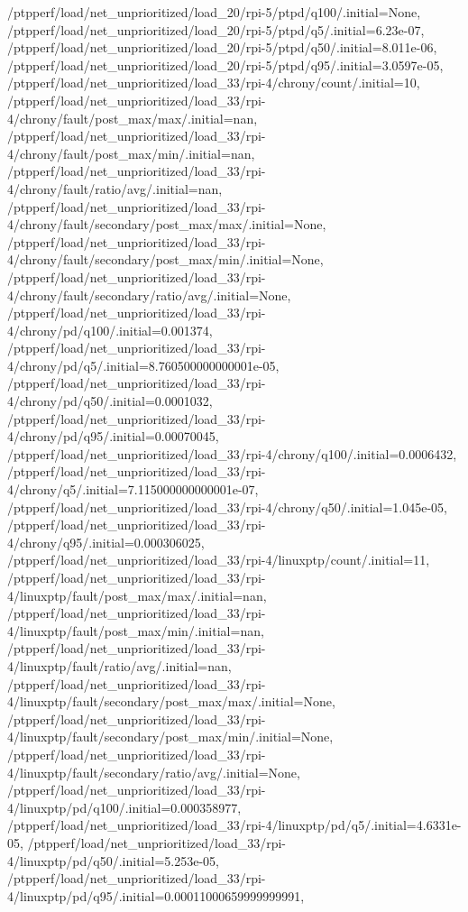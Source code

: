 {    /ptpperf/load/net_unprioritized/load_20/rpi-5/ptpd/q100/.initial=None,
    /ptpperf/load/net_unprioritized/load_20/rpi-5/ptpd/q5/.initial=6.23e-07,
    /ptpperf/load/net_unprioritized/load_20/rpi-5/ptpd/q50/.initial=8.011e-06,
    /ptpperf/load/net_unprioritized/load_20/rpi-5/ptpd/q95/.initial=3.0597e-05,
    /ptpperf/load/net_unprioritized/load_33/rpi-4/chrony/count/.initial=10,
    /ptpperf/load/net_unprioritized/load_33/rpi-4/chrony/fault/post_max/max/.initial=nan,
    /ptpperf/load/net_unprioritized/load_33/rpi-4/chrony/fault/post_max/min/.initial=nan,
    /ptpperf/load/net_unprioritized/load_33/rpi-4/chrony/fault/ratio/avg/.initial=nan,
    /ptpperf/load/net_unprioritized/load_33/rpi-4/chrony/fault/secondary/post_max/max/.initial=None,
    /ptpperf/load/net_unprioritized/load_33/rpi-4/chrony/fault/secondary/post_max/min/.initial=None,
    /ptpperf/load/net_unprioritized/load_33/rpi-4/chrony/fault/secondary/ratio/avg/.initial=None,
    /ptpperf/load/net_unprioritized/load_33/rpi-4/chrony/pd/q100/.initial=0.001374,
    /ptpperf/load/net_unprioritized/load_33/rpi-4/chrony/pd/q5/.initial=8.760500000000001e-05,
    /ptpperf/load/net_unprioritized/load_33/rpi-4/chrony/pd/q50/.initial=0.0001032,
    /ptpperf/load/net_unprioritized/load_33/rpi-4/chrony/pd/q95/.initial=0.00070045,
    /ptpperf/load/net_unprioritized/load_33/rpi-4/chrony/q100/.initial=0.0006432,
    /ptpperf/load/net_unprioritized/load_33/rpi-4/chrony/q5/.initial=7.115000000000001e-07,
    /ptpperf/load/net_unprioritized/load_33/rpi-4/chrony/q50/.initial=1.045e-05,
    /ptpperf/load/net_unprioritized/load_33/rpi-4/chrony/q95/.initial=0.000306025,
    /ptpperf/load/net_unprioritized/load_33/rpi-4/linuxptp/count/.initial=11,
    /ptpperf/load/net_unprioritized/load_33/rpi-4/linuxptp/fault/post_max/max/.initial=nan,
    /ptpperf/load/net_unprioritized/load_33/rpi-4/linuxptp/fault/post_max/min/.initial=nan,
    /ptpperf/load/net_unprioritized/load_33/rpi-4/linuxptp/fault/ratio/avg/.initial=nan,
    /ptpperf/load/net_unprioritized/load_33/rpi-4/linuxptp/fault/secondary/post_max/max/.initial=None,
    /ptpperf/load/net_unprioritized/load_33/rpi-4/linuxptp/fault/secondary/post_max/min/.initial=None,
    /ptpperf/load/net_unprioritized/load_33/rpi-4/linuxptp/fault/secondary/ratio/avg/.initial=None,
    /ptpperf/load/net_unprioritized/load_33/rpi-4/linuxptp/pd/q100/.initial=0.000358977,
    /ptpperf/load/net_unprioritized/load_33/rpi-4/linuxptp/pd/q5/.initial=4.6331e-05,
    /ptpperf/load/net_unprioritized/load_33/rpi-4/linuxptp/pd/q50/.initial=5.253e-05,
    /ptpperf/load/net_unprioritized/load_33/rpi-4/linuxptp/pd/q95/.initial=0.00011000659999999991,
}
